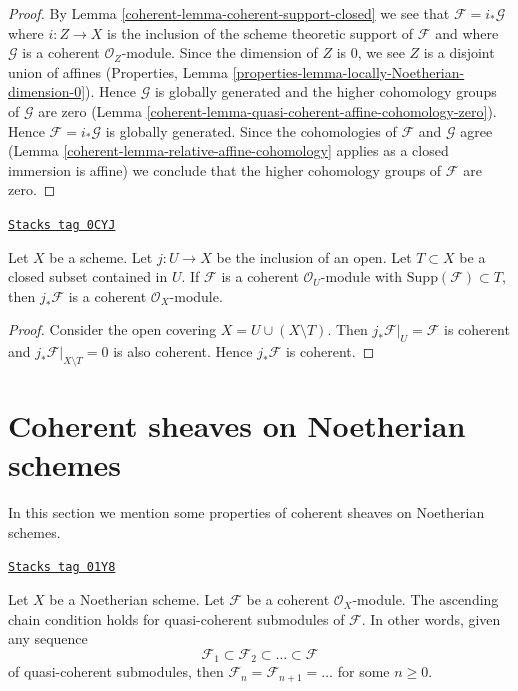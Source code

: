 \begin{proof}

By Lemma \ref{coherent-lemma-coherent-support-closed} we see that
$\mathcal{F} = i_*\mathcal{G}$ where $i : Z \to X$ is the inclusion
of the scheme theoretic support of $\mathcal{F}$ and where $\mathcal{G}$
is a coherent $\mathcal{O}_Z$-module. Since the dimension of $Z$ is
$0$, we see $Z$ is a disjoint union of affines (Properties, Lemma
\ref{properties-lemma-locally-Noetherian-dimension-0}).
Hence $\mathcal{G}$ is globally generated and the higher
cohomology groups of $\mathcal{G}$ are zero
(Lemma \ref{coherent-lemma-quasi-coherent-affine-cohomology-zero}).
Hence $\mathcal{F} = i_*\mathcal{G}$ is globally generated.
Since the cohomologies of $\mathcal{F}$ and $\mathcal{G}$ agree
(Lemma \ref{coherent-lemma-relative-affine-cohomology} applies as a
closed immersion is affine)
we conclude that the higher cohomology groups of $\mathcal{F}$ are zero.
\end{proof}

\begin{lemma}
\label{coherent-lemma-pushforward-coherent-on-open}
\href{https://stacks.math.columbia.edu/tag/0CYJ}{\texttt{Stacks tag 0CYJ}}

Let $X$ be a scheme. Let $j : U \to X$ be the inclusion of an open.
Let $T \subset X$ be a closed subset contained in $U$.
If $\mathcal{F}$ is a coherent $\mathcal{O}_U$-module
with $\text{Supp}(\mathcal{F}) \subset T$, then
$j_*\mathcal{F}$ is a coherent $\mathcal{O}_X$-module.
\end{lemma}

\begin{proof}
Consider the open covering $X = U \cup (X \setminus T)$.
Then $j_*\mathcal{F}|_U = \mathcal{F}$ is coherent and
$j_*\mathcal{F}|_{X \setminus T} = 0$ is also coherent.
Hence $j_*\mathcal{F}$ is coherent.
\end{proof}

\section{Coherent sheaves on Noetherian schemes}
\label{coherent-section-coherent-quasi-compact}
In this section we mention some properties of coherent sheaves on
Noetherian schemes.

\begin{lemma}
\label{coherent-lemma-acc-coherent}
\href{https://stacks.math.columbia.edu/tag/01Y8}{\texttt{Stacks tag 01Y8}}

Let $X$ be a Noetherian scheme.
Let $\mathcal{F}$ be a coherent $\mathcal{O}_X$-module.
The ascending chain condition holds for quasi-coherent submodules
of $\mathcal{F}$. In other words, given any sequence
$$
\mathcal{F}_1 \subset \mathcal{F}_2 \subset \ldots \subset \mathcal{F}
$$
of quasi-coherent submodules, then
$\mathcal{F}_n = \mathcal{F}_{n + 1} = \ldots $ for some $n \geq 0$.
\end{lemma}

